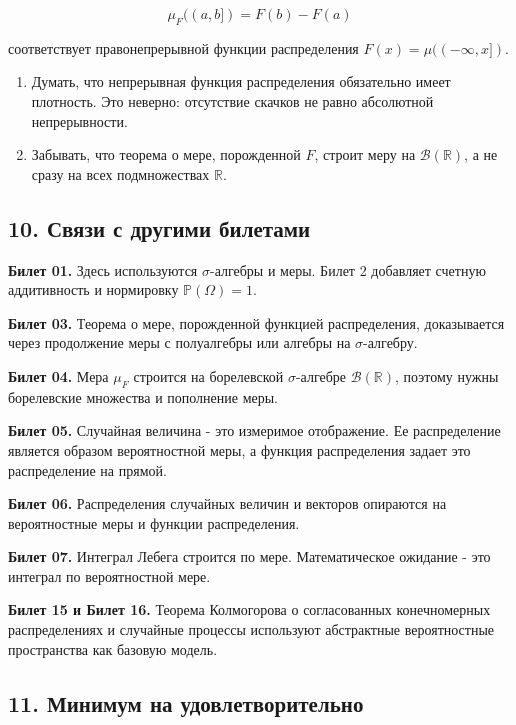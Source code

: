 \documentclass[
  11pt,
  a4paper,
]{article}
\begin{document}
\[
\mu_F((a,b])=F(b)-F(a)
\]

соответствует правонепрерывной функции распределения
\(F(x)=\mu((-\infty,x])\).

\begin{enumerate}
\def\labelenumi{\arabic{enumi}.}
\setcounter{enumi}{6}
\item
  Думать, что непрерывная функция распределения обязательно имеет
  плотность. Это неверно: отсутствие скачков не равно абсолютной
  непрерывности.
\item
  Забывать, что теорема о мере, порожденной \(F\), строит меру на
  \(\mathcal B(\mathbb R)\), а не сразу на всех подмножествах
  \(\mathbb R\).
\end{enumerate}

\subsection{10. Связи с другими
билетами}\label{ux441ux432ux44fux437ux438-ux441-ux434ux440ux443ux433ux438ux43cux438-ux431ux438ux43bux435ux442ux430ux43cux438}

\textbf{Билет 01.} Здесь используются \(\sigma\)-алгебры и меры. Билет 2
добавляет счетную аддитивность и нормировку \(\mathbb P(\Omega)=1\).

\textbf{Билет 03.} Теорема о мере, порожденной функцией распределения,
доказывается через продолжение меры с полуалгебры или алгебры на
\(\sigma\)-алгебру.

\textbf{Билет 04.} Мера \(\mu_F\) строится на борелевской
\(\sigma\)-алгебре \(\mathcal B(\mathbb R)\), поэтому нужны борелевские
множества и пополнение меры.

\textbf{Билет 05.} Случайная величина - это измеримое отображение. Ее
распределение является образом вероятностной меры, а функция
распределения задает это распределение на прямой.

\textbf{Билет 06.} Распределения случайных величин и векторов опираются
на вероятностные меры и функции распределения.

\textbf{Билет 07.} Интеграл Лебега строится по мере. Математическое
ожидание - это интеграл по вероятностной мере.

\textbf{Билет 15 и Билет 16.} Теорема Колмогорова о согласованных
конечномерных распределениях и случайные процессы используют абстрактные
вероятностные пространства как базовую модель.

\subsection{11. Минимум на
удовлетворительно}\label{ux43cux438ux43dux438ux43cux443ux43c-ux43dux430-ux443ux434ux43eux432ux43bux435ux442ux432ux43eux440ux438ux442ux435ux43bux44cux43dux43e}
\end{document}

